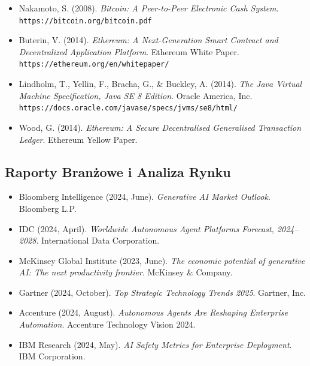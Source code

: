 \documentclass[11pt]{article}
\begin{document}
\begin{itemize}[leftmargin=*, label={}]
  \item Nakamoto, S. (2008). \textit{Bitcoin: A Peer-to-Peer Electronic Cash System}. \texttt{https://bitcoin.org/bitcoin.pdf}

  \item Buterin, V. (2014). \textit{Ethereum: A Next-Generation Smart Contract and Decentralized Application Platform}. Ethereum White Paper. \texttt{https://ethereum.org/en/whitepaper/}

  \item Lindholm, T., Yellin, F., Bracha, G., \& Buckley, A. (2014). \textit{The Java Virtual Machine Specification, Java SE 8 Edition}. Oracle America, Inc. \texttt{https://docs.oracle.com/javase/specs/jvms/se8/html/}

  \item Wood, G. (2014). \textit{Ethereum: A Secure Decentralised Generalised Transaction Ledger}. Ethereum Yellow Paper.
\end{itemize}

\subsection*{Raporty Branżowe i Analiza Rynku}

\begin{itemize}[leftmargin=*, label={}]
  \item Bloomberg Intelligence (2024, June). \textit{Generative AI Market Outlook}. Bloomberg L.P.

  \item IDC (2024, April). \textit{Worldwide Autonomous Agent Platforms Forecast, 2024--2028}. International Data Corporation.

  \item McKinsey Global Institute (2023, June). \textit{The economic potential of generative AI: The next productivity frontier}. McKinsey \& Company.

  \item Gartner (2024, October). \textit{Top Strategic Technology Trends 2025}. Gartner, Inc.

  \item Accenture (2024, August). \textit{Autonomous Agents Are Reshaping Enterprise Automation}. Accenture Technology Vision 2024.

  \item IBM Research (2024, May). \textit{AI Safety Metrics for Enterprise Deployment}. IBM Corporation.
\end{itemize}
\end{document}
